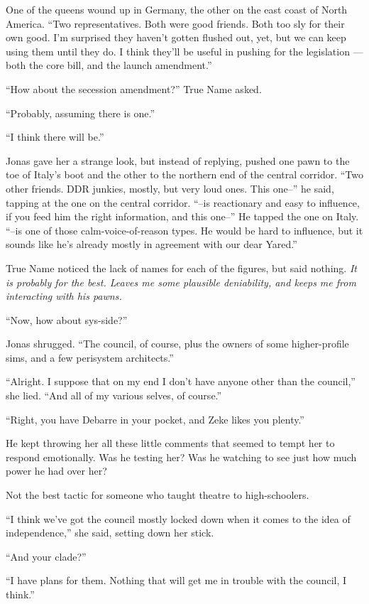 One of the queens wound up in Germany, the other on the east coast of North America. ``Two representatives. Both were good friends. Both too sly for their own good. I'm surprised they haven't gotten flushed out, yet, but we can keep using them until they do. I think they'll be useful in pushing for the legislation — both the core bill, and the launch amendment.''

``How about the secession amendment?'' True Name asked.

``Probably, assuming there is one.''

``I think there will be.''

Jonas gave her a strange look, but instead of replying, pushed one pawn to the toe of Italy's boot and the other to the northern end of the central corridor. ``Two other friends. DDR junkies, mostly, but very loud ones. This one--'' he said, tapping at the one on the central corridor. ``--is reactionary and easy to influence, if you feed him the right information, and this one--'' He tapped the one on Italy. ``--is one of those calm-voice-of-reason types. He would be hard to influence, but it sounds like he's already mostly in agreement with our dear Yared.''

True Name noticed the lack of names for each of the figures, but said nothing. \emph{It is probably for the best. Leaves me some plausible deniability, and keeps me from interacting with his pawns.}

``Now, how about sys-side?''

Jonas shrugged. ``The council, of course, plus the owners of some higher-profile sims, and a few perisystem architects.''

``Alright. I suppose that on my end I don't have anyone other than the council,'' she lied. ``And all of my various selves, of course.''

``Right, you have Debarre in your pocket, and Zeke likes you plenty.''

He kept throwing her all these little comments that seemed to tempt her to respond emotionally. Was he testing her? Was he watching to see just how much power he had over her?

Not the best tactic for someone who taught theatre to high-schoolers.

``I think we've got the council mostly locked down when it comes to the idea of independence,'' she said, setting down her stick.

``And your clade?''

``I have plans for them. Nothing that will get me in trouble with the council, I think.''

